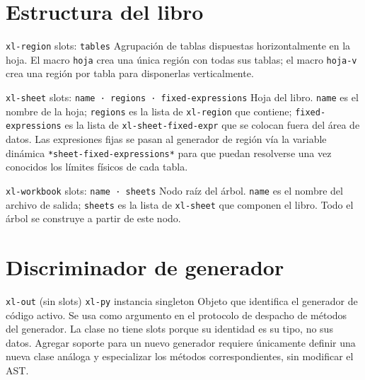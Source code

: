 \documentclass[12pt,a4paper]{report}
\begin{document}
\section{Estructura del libro}

\begin{nodobox}{\texttt{xl-region} \quad \small\textmd{slots:} \texttt{tables}}
Agrupación de tablas dispuestas horizontalmente en la hoja. El macro \texttt{hoja} crea una única región con todas sus tablas; el macro \texttt{hoja-v} crea una región por tabla para disponerlas verticalmente.
\end{nodobox}

\vspace{0.5em}

\begin{nodobox}{\texttt{xl-sheet} \quad \small\textmd{slots:} \texttt{name · regions · fixed-expressions}}
Hoja del libro. \texttt{name} es el nombre de la hoja; \texttt{regions} es la lista de \texttt{xl-region} que contiene; \texttt{fixed-expressions} es la lista de \texttt{xl-sheet-fixed-expr} que se colocan fuera del área de datos. Las expresiones fijas se pasan al generador de región vía la variable dinámica \texttt{*sheet-fixed-expressions*} para que puedan resolverse una vez conocidos los límites físicos de cada tabla.
\end{nodobox}

\vspace{0.5em}

\begin{nodobox}{\texttt{xl-workbook} \quad \small\textmd{slots:} \texttt{name · sheets}}
Nodo raíz del árbol. \texttt{name} es el nombre del archivo de salida; \texttt{sheets} es la lista de \texttt{xl-sheet} que componen el libro. Todo el árbol se construye a partir de este nodo.
\end{nodobox}

\section{Discriminador de generador}

\begin{nodobox}{\texttt{xl-out} \quad \small\textmd{(sin slots)} \qquad \texttt{xl-py} \quad \small\textmd{instancia singleton}}
Objeto que identifica el generador de código activo. Se usa como argumento en el protocolo de despacho de métodos del generador. La clase no tiene slots porque su identidad es su tipo, no sus datos. Agregar soporte para un nuevo generador requiere únicamente definir una nueva clase análoga y especializar los métodos correspondientes, sin modificar el AST.
\end{nodobox}
\end{document}

